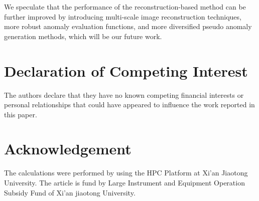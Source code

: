 \documentclass[5p, twocolumn]{elsarticle}[draft]
\begin{document}
We speculate that the performance of the reconstruction-based method can be further improved by introducing multi-scale image reconstruction techniques, more robust anomaly evaluation functions, and more diversified pseudo anomaly generation methods, which will be our future work.





\section*{Declaration of Competing Interest}
The authors declare that they have no known competing financial interests or personal relationships that could have appeared to influence the work reported in this paper.

\section*{Acknowledgement}
The calculations were performed by using the HPC Platform at Xi’an Jiaotong University. The article is fund by Large Instrument and Equipment Operation Subsidy Fund of Xi'an jiaotong University.
\end{document}
